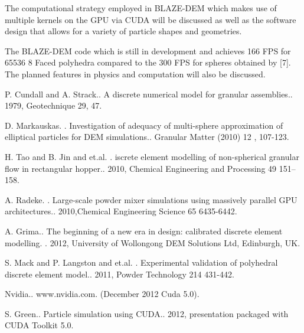 \documentclass[article,A4,11pt]{llncs}%
\begin{document}
The computational strategy employed in BLAZE-DEM which makes use of multiple kernels on the GPU via CUDA will be discussed as well as the software design that allows for a variety of particle shapes and geometries. 

The BLAZE-DEM code which is still in development and achieves 166 FPS for 65536 8 Faced polyhedra compared to the 300 FPS for spheres obtained by [7]. The planned features in physics and computation will also be discussed.


\begin{thebibliography}{10}
{\sc P. Cundall and A. Strack.}. {A discrete numerical model for granular assemblies.}. 1979, Geotechnique 29, 47.

{\sc D. Markauskas. }. {Investigation of adequacy of multi-sphere approximation of elliptical particles for DEM simulations.}. Granular Matter (2010) 12 , 107-123.

{\sc H. Tao and B. Jin and et.al. }. {iscrete element modelling of non-spherical granular flow in rectangular hopper.}. 2010, Chemical Engineering and Processing 49 151–158.

{\sc A. Radeke. }. {Large-scale powder mixer simulations using massively parallel GPU architectures.}.  2010,Chemical Engineering Science 65 6435-6442.

{\sc A. Grima.}. {The beginning of a new era in design: calibrated discrete element modelling. }. 2012, University of Wollongong DEM Solutions Ltd, Edinburgh, UK.

{\sc S. Mack and P. Langston and et.al. }. {Experimental validation of polyhedral discrete element model.}. 2011, Powder Technology 214 431-442.

{ Nvidia.}. {www.nvidia.com}. (December 2012 Cuda 5.0).

{\sc S. Green.}. {Particle simulation using CUDA.}. 2012, presentation packaged with CUDA Toolkit 5.0.
\end{thebibliography}
\end{document}
